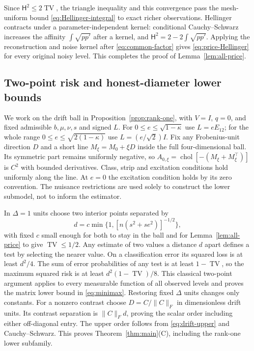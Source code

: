 \documentclass[11pt,a4paper]{amsart}
\theoremstyle{plain}
\theoremstyle{definition}
\theoremstyle{remark}
\DeclareMathOperator{\chol}{chol}
\DeclareMathOperator{\TV}{TV}
\newcommand{\Hell}{\mathsf H}
\begin{document}
Since $\Hell^2\le2\TV$, the triangle inequality and this convergence pass
the mesh-uniform bound \eqref{eq:Hellinger-integral} to exact richer
observations. Hellinger contracts under a parameter-independent kernel:
conditional Cauchy--Schwarz increases the affinity
$\int\sqrt{pp'}$ after a kernel, and
$\Hell^2=2-2\int\sqrt{pp'}$. Applying the reconstruction and noise kernel after
\eqref{eq:common-factor} gives \eqref{eq:price-Hellinger} for every
original noisy level. This completes the proof of
Lemma~\ref{lem:all-price}.

\subsection{Two-point risk and honest-diameter lower bounds}

We work on the drift ball in Proposition~\ref{prop:rank-one}, with $V=I$, $q=0$,
and fixed admissible $b,\mu,\nu,s$ and signed $L$.
For $0\le e\le\sqrt{1-\kappa}$ use $L=eE_{12}$; for the whole range
$0\le e\le\sqrt{2(1-\kappa)}$ use $L=(e/\sqrt2)I$.
Fix any Frobenius-unit direction $D$ and a short line
$M_\xi=M_0+\xi D$ inside the full four-dimensional ball. Its symmetric
part remains uniformly negative, so
$A_{0,\xi}=\chol[-(M_\xi+M_\xi^\top)]$ is $C^2$ with bounded
derivatives. Class, strip and excitation conditions hold uniformly along
the line. At $e=0$ the excitation condition holds by its zero convention.
The nuisance restrictions are used solely to construct the lower submodel,
not to inform the estimator.

In $\Delta=1$ units choose two interior points separated by
\begin{equation}\label{eq:two-point-separation}
 d=c\min\{1,[n(s^2+se^2)]^{-1/2}\},
\end{equation}
with fixed $c$ small enough for both to stay in the ball and for
Lemma~\ref{lem:all-price} to give $\TV\le1/2$.
Any estimate of two values a distance $d$ apart defines a test by selecting
the nearer value. On a classification error its squared loss is at least
$d^2/4$. The sum of error probabilities of any test is at least
$1-\TV$, so the maximum squared risk is at least
$d^2(1-\TV)/8$. This classical two-point argument applies to every
measurable function of all observed levels and proves the matrix lower
bound in \eqref{eq:minimax}. Restoring fixed $\Delta$ units changes only
constants. For a nonzero contrast choose $D=C/\|C\|_F$ in dimensionless
drift units. Its contrast separation is $\|C\|_F d$, proving the scalar
order including either off-diagonal entry. The upper order follows from
\eqref{eq:drift-upper} and Cauchy--Schwarz. This proves
Theorem~\ref{thm:main}(C), including the rank-one lower subfamily.
\end{document}
